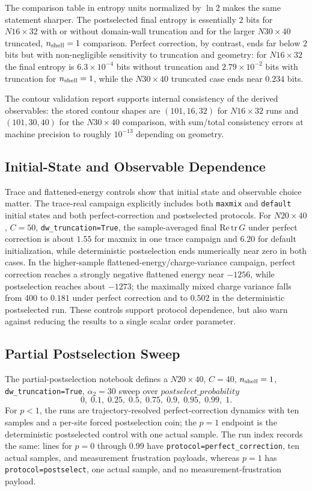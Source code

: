 \documentclass[aps,prb,onecolumn,nofootinbib,superscriptaddress]{revtex4-2}
\begin{document}
The comparison table in entropy units normalized by $\ln 2$ makes the same
statement sharper.  The postselected final entropy is essentially $2$ bits for
$N16\times32$ with or without domain-wall truncation and for the larger
$N30\times40$ truncated, $n_{\rm shell}=1$ comparison.  Perfect correction,
by contrast, ends far below $2$ bits but with non-negligible sensitivity to
truncation and geometry: for $N16\times32$ the final entropy is
$6.3\times10^{-4}$ bits without truncation and $2.79\times10^{-2}$ bits with
truncation for $n_{\rm shell}=1$, while the $N30\times40$ truncated case ends
near $0.234$ bits.

The contour validation report supports internal consistency of the derived
observables: the stored contour shapes are $(101,16,32)$ for $N16\times32$ runs
and $(101,30,40)$ for the $N30\times40$ comparison, with sum/total consistency
errors at machine precision to roughly $10^{-13}$ depending on geometry.

\subsection{Initial-State and Observable Dependence}

Trace and flattened-energy controls show that initial state and observable
choice matter.  The trace-real campaign explicitly includes both \texttt{maxmix}
and \texttt{default} initial states and both perfect-correction and postselected
protocols.  For $N20\times40$, $C=50$, \texttt{dw\_truncation=True}, the
sample-averaged final $\mathrm{Re}\,\mathrm{tr}\,G$ under perfect correction is
about $1.55$ for maxmix in one trace campaign and $6.20$ for default
initialization, while deterministic postselection ends numerically near zero in
both cases.  In the higher-sample flattened-energy/charge-variance campaign,
perfect correction reaches a strongly negative flattened energy near
$-1256$, while postselection reaches about $-1273$; the maximally mixed charge
variance falls from $400$ to $0.181$ under perfect correction and to $0.502$ in
the deterministic postselected run.  These controls support protocol dependence,
but also warn against reducing the results to a single scalar order parameter.

\subsection{Partial Postselection Sweep}

The partial-postselection notebook defines a $N20\times40$, $C=40$,
$n_{\rm shell}=1$, \texttt{dw\_truncation=True}, $\alpha_2=30$ sweep over
$postselect\_probability$
\[
0,\;0.1,\;0.25,\;0.5,\;0.75,\;0.9,\;0.95,\;0.99,\;1.
\]
For $p<1$, the runs are trajectory-resolved perfect-correction dynamics with
ten samples and a per-site forced postselection coin; the $p=1$ endpoint is the
deterministic postselected control with one actual sample.  The run index records
the same: lines for $p=0$ through $0.99$ have
\texttt{protocol=perfect\_correction}, ten actual samples, and measurement
frustration payloads, whereas $p=1$ has \texttt{protocol=postselect}, one actual
sample, and no measurement-frustration payload.
\end{document}
